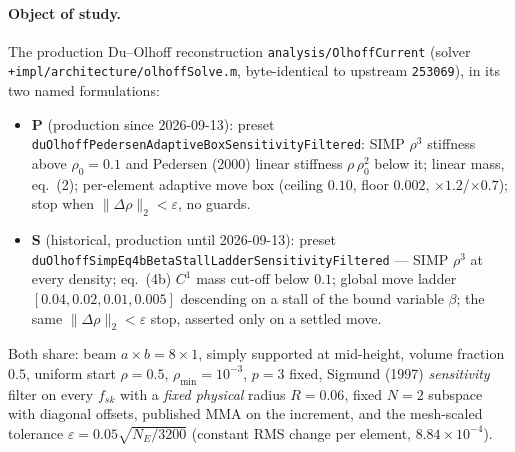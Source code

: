 \documentclass[10pt,a4paper]{article}
\newcommand{\code}[1]{\texttt{\small #1}}
\begin{document}
\paragraph{Object of study.} The production Du--Olhoff reconstruction \code{analysis/OlhoffCurrent} (solver \code{+impl/architecture/\allowbreak olhoffSolve.m}, byte-identical to upstream \code{253069}), in its two named formulations:
\begin{itemize}
\item \textbf{P} (production since 2026-09-13): preset \code{duOlhoffPedersen\allowbreak AdaptiveBox\allowbreak SensitivityFiltered}: SIMP $\rho^3$ stiffness above $\rho_0=0.1$ and Pedersen (2000) linear stiffness $\rho\,\rho_0^{2}$ below it; linear mass, eq.~(2); per-element adaptive move box (ceiling $0.10$, floor $0.002$, $\times1.2$/$\times0.7$); stop when $\|\Delta\rho\|_2<\varepsilon$, no guards.
\item \textbf{S} (historical, production until 2026-09-13): preset \code{duOlhoffSimpEq4b\allowbreak BetaStallLadder\allowbreak SensitivityFiltered} --- SIMP $\rho^3$ at every density; eq.~(4b) $C^1$ mass cut-off below $0.1$; global move ladder $[0.04,0.02,0.01,0.005]$ descending on a stall of the bound variable $\beta$; the same $\|\Delta\rho\|_2<\varepsilon$ stop, asserted only on a settled move.
\end{itemize}
Both share: beam $a\times b=8\times1$, simply supported at mid-height, volume fraction $0.5$, uniform start $\rho=0.5$, $\rho_{\min}=10^{-3}$, $p=3$ fixed, Sigmund (1997) \emph{sensitivity} filter on every $f_{sk}$ with a \emph{fixed physical} radius $R=0.06$, fixed $N=2$ subspace with diagonal offsets, published MMA on the increment, and the mesh-scaled tolerance $\varepsilon=0.05\sqrt{N_E/3200}$ (constant RMS change per element, $8.84\times10^{-4}$).
\endgroup
\end{document}
